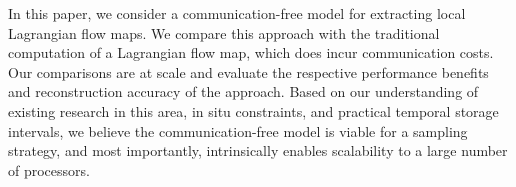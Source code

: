 In this paper, we consider a communication-free model for extracting local Lagrangian flow maps. 
%
We compare this approach with the traditional computation of a Lagrangian flow map, which does incur communication costs.
%
Our comparisons are at scale and evaluate the respective performance benefits and reconstruction accuracy of the approach.
%
Based on our understanding of existing research in this area, in situ constraints, and practical temporal storage intervals, we believe the communication-free model is viable for a sampling strategy, and most importantly, intrinsically enables scalability to a large number of processors.

%
%
%
%
%
%

